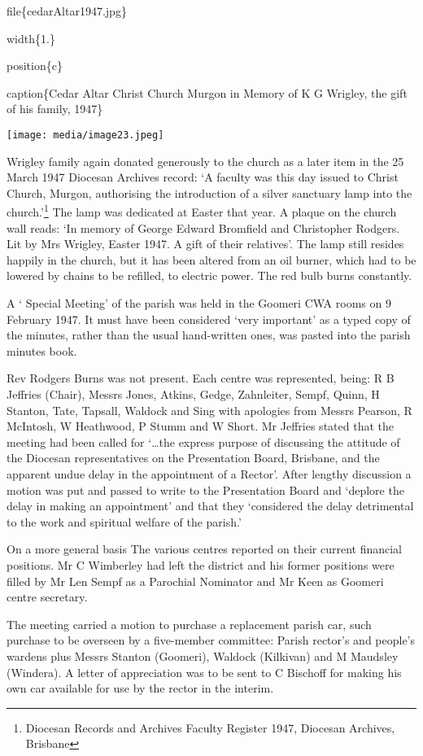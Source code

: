 file\{cedarAltar1947.jpg\}

width\{1.\}

position\{c\}

caption\{Cedar Altar Christ Church Murgon in Memory of K G Wrigley, the gift of his family, 1947\}

\texttt{[image: media/image23.jpeg]}

Wrigley family again donated generously to the church as a later item in the 25 March 1947 Diocesan Archives record: `A faculty was this day issued to Christ Church, Murgon, authorising the introduction of a silver sanctuary lamp into the church.'\footnote{Diocesan Records and Archives Faculty Register 1947, Diocesan Archives, Brisbane} The lamp was dedicated at Easter that year. A plaque on the church wall reads: `In memory of George Edward Bromfield and Christopher Rodgers. Lit by Mrs Wrigley, Easter 1947. A gift of their relatives'. The lamp still resides happily in the church, but it has been altered from an oil burner, which had to be lowered by chains to be refilled, to electric power. The red bulb burns constantly.

A ` Special Meeting' of the parish was held in the Goomeri CWA rooms on 9 February 1947. It must have been considered `very important' as a typed copy of the minutes, rather than the usual hand-written ones, was pasted into the parish minutes book.

Rev Rodgers Burns was not present. Each centre was represented, being: R B Jeffries (Chair), Messrs Jones, Atkins, Gedge, Zahnleiter, Sempf, Quinn, H Stanton, Tate, Tapsall, Waldock and Sing with apologies from Messrs Pearson, R McIntosh, W Heathwood, P Stumm and W Short. Mr Jeffries stated that the meeting had been called for `\ldots the express purpose of discussing the attitude of the Diocesan representatives on the Presentation Board, Brisbane, and the apparent undue delay in the appointment of a Rector'. After lengthy discussion a motion was put and passed to write to the Presentation Board and `deplore the delay in making an appointment' and that they `considered the delay detrimental to the work and spiritual welfare of the parish.'

On a more general basis The various centres reported on their current financial positions. Mr C Wimberley had left the district and his former positions were filled by Mr Len Sempf as a Parochial Nominator and Mr Keen as Goomeri centre secretary.

The meeting carried a motion to purchase a replacement parish car, such purchase to be overseen by a five-member committee: Parish rector's and people's wardens plus Messrs Stanton (Goomeri), Waldock (Kilkivan) and M Maudsley (Windera). A letter of appreciation was to be sent to C Bischoff for making his own car available for use by the rector in the interim.

